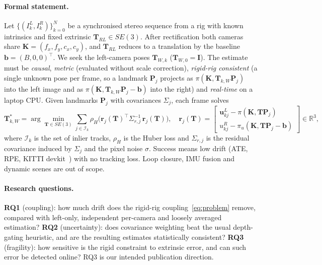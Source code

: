 \documentclass[11pt,a4paper]{article}
\newcommand{\R}{\mathbb{R}}
\newcommand{\T}{\mathbf{T}}
\begin{document}
\paragraph{Formal statement.}
Let $\{(I^L_k, I^R_k)\}_{k=0}^{N}$ be a synchronised stereo sequence from a rig with known intrinsics and fixed extrinsic $\T_{RL}\in SE(3)$. After rectification both cameras share $\mathbf K = (f_x, f_y, c_x, c_y)$, and $\T_{RL}$ reduces to a translation by the baseline $\mathbf b = (B, 0, 0)^\top$. We seek the left-camera poses $\T_{W,k}$ ($\T_{W,0} = \mathbf I$). The estimate must be \emph{causal}, \emph{metric} (evaluated without scale correction), \emph{rigid-rig consistent} (a single unknown pose per frame, so a landmark $\mathbf P_j$ projects as $\pi(\mathbf K, \T_{k,W}\mathbf P_j)$ into the left image and as $\pi(\mathbf K, \T_{k,W}\mathbf P_j - \mathbf b)$ into the right) and \emph{real-time} on a laptop CPU. Given landmarks $\mathbf P_j$ with covariances $\Sigma_j$, each frame solves
\begin{equation}
  \T_{k,W}^\ast = \arg\min_{\T\in SE(3)} \sum_{j\in\mathcal I_k} \rho_H\!\big(\mathbf r_j(\T)^\top \Sigma_{r,j}^{-1}\, \mathbf r_j(\T)\big),
  \quad
  \mathbf r_j(\T) = \begin{bmatrix} \mathbf u^L_{kj} - \pi(\mathbf K, \T\mathbf P_j) \\ u^R_{kj} - \pi_u(\mathbf K, \T\mathbf P_j - \mathbf b)\end{bmatrix}\!\in\R^3,
  \label{eq:problem}
\end{equation}
where $\mathcal I_k$ is the set of inlier tracks, $\rho_H$ is the Huber loss and $\Sigma_{r,j}$ is the residual covariance induced by $\Sigma_j$ and the pixel noise $\sigma$. Success means low drift (ATE, RPE, KITTI devkit~\cite{kitti,sturm,zhang_eval}) with no tracking loss. Loop closure, IMU fusion and dynamic scenes are out of scope.

\paragraph{Research questions.} \textbf{RQ1} (coupling): how much drift does the rigid-rig coupling~\eqref{eq:problem} remove, compared with left-only, independent per-camera and loosely averaged estimation? \textbf{RQ2} (uncertainty): does covariance weighting beat the usual depth-gating heuristic, and are the resulting estimates statistically consistent? \textbf{RQ3} (fragility): how sensitive is the rigid constraint to extrinsic error, and can such error be detected online? RQ3 is our intended publication direction.
\end{document}

